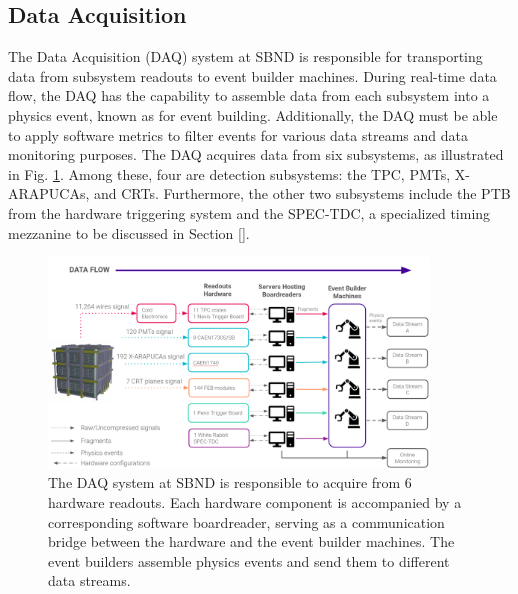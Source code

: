 \subsection{Data Acquisition}

\label{sec4DAQOverview}

The Data Acquisition (DAQ) system at SBND is responsible for transporting data from subsystem readouts to event builder machines. 
During real-time data flow, the DAQ has the capability to assemble data from each subsystem into a physics event, known as for event building. 
Additionally, the DAQ must be able to apply software metrics to filter events for various data streams and data monitoring purposes.
The DAQ acquires data from six subsystems, as illustrated in Fig. \ref{fig:daqOverview}. 
Among these, four are detection subsystems: the TPC, PMTs, X-ARAPUCAs, and CRTs. 
Furthermore, the other two subsystems include the PTB from the hardware triggering system and the SPEC-TDC, a specialized timing mezzanine to be discussed in Section \ref{}.

\begin{figure}[htbp] 
\centering    
\includegraphics[width=0.90\textwidth]{DAQ_Overview}
\caption[DAQOverview]{
The DAQ system at SBND is responsible to acquire from 6 hardware readouts.
Each hardware component is accompanied by a corresponding software boardreader, serving as a communication bridge between the hardware and the event builder machines.
The event builders assemble physics events and send them to different data streams.
}
\label{fig:daqOverview}
\end{figure}

